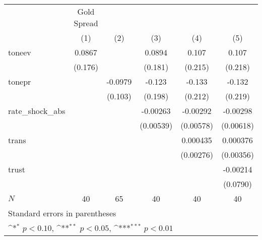 {
\def\sym#1{\ifmmode^{#1}\else\(^{#1}\)\fi}
\begin{tabular}{l*{5}{c}}
\hline\hline
            & Gold Spread         &                     &                     &                     &                     \\
            &\multicolumn{1}{c}{(1)}         &\multicolumn{1}{c}{(2)}         &\multicolumn{1}{c}{(3)}         &\multicolumn{1}{c}{(4)}         &\multicolumn{1}{c}{(5)}         \\
\hline
toneev      &      0.0867         &                     &      0.0894         &       0.107         &       0.107         \\
            &     (0.176)         &                     &     (0.181)         &     (0.215)         &     (0.218)         \\
[1em]
tonepr      &                     &     -0.0979         &      -0.123         &      -0.133         &      -0.132         \\
            &                     &     (0.103)         &     (0.198)         &     (0.212)         &     (0.219)         \\
[1em]
rate\_shock\_abs&                     &                     &    -0.00263         &    -0.00292         &    -0.00298         \\
            &                     &                     &   (0.00539)         &   (0.00578)         &   (0.00618)         \\
[1em]
trans       &                     &                     &                     &    0.000435         &    0.000376         \\
            &                     &                     &                     &   (0.00276)         &   (0.00356)         \\
[1em]
trust       &                     &                     &                     &                     &    -0.00214         \\
            &                     &                     &                     &                     &    (0.0790)         \\
\hline
\(N\)       &          40         &          65         &          40         &          40         &          40         \\
\hline\hline
\multicolumn{6}{l}{\footnotesize Standard errors in parentheses}\\
\multicolumn{6}{l}{\footnotesize \sym{*} \(p<0.10\), \sym{**} \(p<0.05\), \sym{***} \(p<0.01\)}\\
\end{tabular}
}
